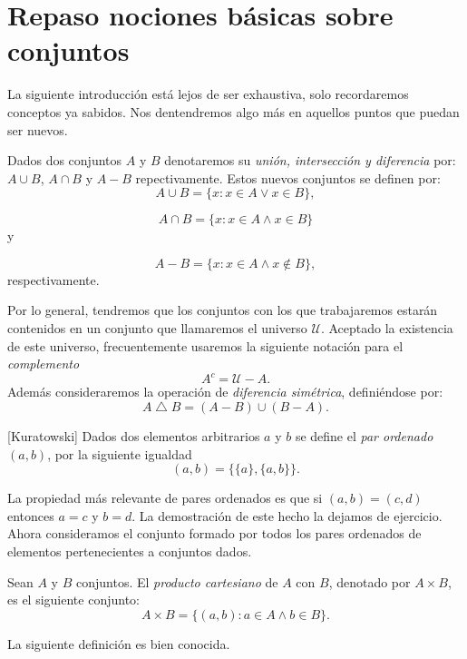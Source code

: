 



\section{Repaso nociones básicas sobre  conjuntos}
La siguiente introducción está lejos de ser exhaustiva, solo
recordaremos conceptos ya sabidos. Nos dentendremos algo más en
aquellos puntos que puedan ser nuevos.

\begin{definicion}{} Dados dos conjuntos $A$ y $B$ denotaremos su \emph{unión,
intersección y diferencia} por: $A\cup B$, $A\cap B$ y $A-B$
repectivamente. Estos nuevos conjuntos se definen por: 
\[A\cup B=\{x:x\in A\vee x\in B\},\]

\[A\cap B=\{x:x\in A\wedge x\in B\}\]
y

\[A-B=\{x:x\in A \wedge x\notin B\},\]
respectivamente.
\end{definicion}
 Por lo general, tendremos que los
conjuntos con los que trabajaremos estarán contenidos en un
conjunto que llamaremos el universo $\mathcal{U}$. Aceptado la
existencia de este universo, frecuentemente usaremos la siguiente
notación para el \emph{complemento} 
\[A^c=\mathcal{U}-A.\] 
Además consideraremos la operación de \emph{diferencia simétrica},
definiéndose por:
\[A\bigtriangleup B=(A-B)\cup(B-A).\]
\begin{definicion}{}[Kuratowski] Dados dos elementos arbitrarios $a$ y $b$ se
define el \emph{par ordenado} $(a,b)$, por la siguiente igualdad
\[(a,b)=\{\{a\},\{a,b\}\}.\]
\end{definicion}

La propiedad más relevante de pares ordenados es que si 
$(a,b)=(c,d)$ entonces $a=c$ y $b=d$. La demostración de este hecho la dejamos de ejercicio. Ahora consideramos el
conjunto formado por todos los pares ordenados de elementos
pertenecientes a conjuntos dados.

\begin{definicion}{}  Sean $A$ y $B$ conjuntos. El \emph{producto cartesiano} de $A$ con
$B$, denotado por $A\times B$, es el siguiente conjunto:
\[A\times B=\{(a,b):a\in A\wedge b\in B\}.\]
\end{definicion}
La siguiente definición es bien conocida.

